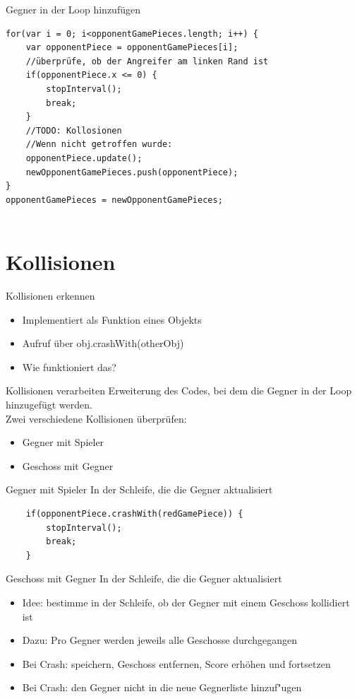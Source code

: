 \documentclass[18pt]{beamer}
\begin{document}
\begin{frame}[fragile]{Gegner in der Loop hinzufügen}
\begin{lstlisting}	
for(var i = 0; i<opponentGamePieces.length; i++) {
	var opponentPiece = opponentGamePieces[i];
	//überprüfe, ob der Angreifer am linken Rand ist
	if(opponentPiece.x <= 0) {
		stopInterval();
		break;
	}
	//TODO: Kollosionen
	//Wenn nicht getroffen wurde: 
	opponentPiece.update();
	newOpponentGamePieces.push(opponentPiece);
}
opponentGamePieces = newOpponentGamePieces;
	
\end{lstlisting}
\end{frame}

\section{Kollisionen}
\begin{frame}{Kollisionen erkennen}
\begin{itemize}
	\item Implementiert als Funktion eines Objekts
	\item Aufruf über \glqq obj.crashWith(otherObj)\grqq{}
	\item Wie funktioniert das?
\end{itemize}

\end{frame}

\begin{frame}{Kollisionen verarbeiten}
Erweiterung des Codes, bei dem die Gegner in der Loop hinzugefügt werden.\\
Zwei verschiedene Kollisionen überprüfen:
\begin{itemize}
	\item Gegner mit Spieler
	\item Geschoss mit Gegner
\end{itemize}
\end{frame}

\begin{frame}[fragile]{Gegner mit Spieler}
In der Schleife, die die Gegner aktualisiert
\begin{lstlisting}
	if(opponentPiece.crashWith(redGamePiece)) {
		stopInterval();
		break;
	}
\end{lstlisting}
\end{frame}

\begin{frame}{Geschoss mit Gegner}
In der Schleife, die die Gegner aktualisiert
\begin{itemize}
	\item Idee: bestimme in der Schleife, ob der Gegner mit einem Geschoss kollidiert ist
	\item Dazu: Pro Gegner werden jeweils alle Geschosse durchgegangen
	\item Bei Crash: speichern, Geschoss entfernen, Score erhöhen und fortsetzen
	\item Bei Crash: den Gegner nicht in die neue Gegnerliste hinzuf"ugen
\end{itemize}
\end{frame}
\end{document}
